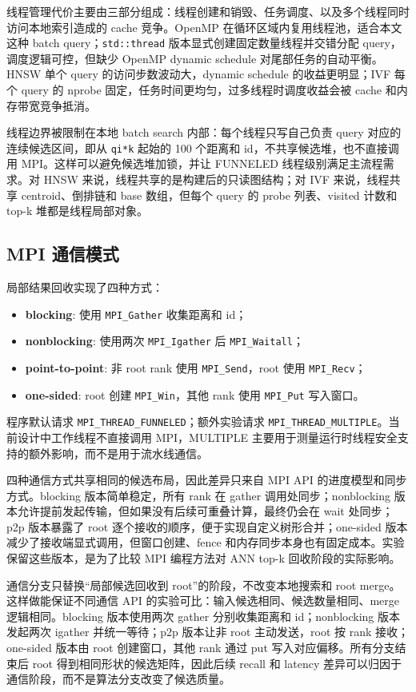 \documentclass[11pt,a4paper]{article}
\begin{document}
线程管理代价主要由三部分组成：线程创建和销毁、任务调度、以及多个线程同时访问本地索引造成的 cache 竞争。OpenMP 在循环区域内复用线程池，适合本文这种 batch query；\texttt{std::thread} 版本显式创建固定数量线程并交错分配 query，调度逻辑可控，但缺少 OpenMP dynamic schedule 对尾部任务的自动平衡。HNSW 单个 query 的访问步数波动大，dynamic schedule 的收益更明显；IVF 每个 query 的 nprobe 固定，任务时间更均匀，过多线程时调度收益会被 cache 和内存带宽竞争抵消。

线程边界被限制在本地 batch search 内部：每个线程只写自己负责 query 对应的连续候选区间，即从 \texttt{qi*k} 起始的 100 个距离和 id，不共享候选堆，也不直接调用 MPI。这样可以避免候选堆加锁，并让 FUNNELED 线程级别满足主流程需求。对 HNSW 来说，线程共享的是构建后的只读图结构；对 IVF 来说，线程共享 centroid、倒排链和 base 数组，但每个 query 的 probe 列表、visited 计数和 top-k 堆都是线程局部对象。

\subsection{MPI 通信模式}

局部结果回收实现了四种方式：
\begin{itemize}
    \item \textbf{blocking}: 使用 \texttt{MPI\_Gather} 收集距离和 id；
    \item \textbf{nonblocking}: 使用两次 \texttt{MPI\_Igather} 后 \texttt{MPI\_Waitall}；
    \item \textbf{point-to-point}: 非 root rank 使用 \texttt{MPI\_Send}，root 使用 \texttt{MPI\_Recv}；
    \item \textbf{one-sided}: root 创建 \texttt{MPI\_Win}，其他 rank 使用 \texttt{MPI\_Put} 写入窗口。
\end{itemize}
程序默认请求 \texttt{MPI\_THREAD\_FUNNELED}；额外实验请求 \texttt{MPI\_THREAD\_MULTIPLE}。当前设计中工作线程不直接调用 MPI，MULTIPLE 主要用于测量运行时线程安全支持的额外影响，而不是用于流水线通信。

四种通信方式共享相同的候选布局，因此差异只来自 MPI API 的进度模型和同步方式。blocking 版本简单稳定，所有 rank 在 gather 调用处同步；nonblocking 版本允许提前发起传输，但如果没有后续可重叠计算，最终仍会在 wait 处同步；p2p 版本暴露了 root 逐个接收的顺序，便于实现自定义树形合并；one-sided 版本减少了接收端显式调用，但窗口创建、fence 和内存同步本身也有固定成本。实验保留这些版本，是为了比较 MPI 编程方法对 ANN top-k 回收阶段的实际影响。

通信分支只替换“局部候选回收到 root”的阶段，不改变本地搜索和 root merge。这样做能保证不同通信 API 的实验可比：输入候选相同、候选数量相同、merge 逻辑相同。blocking 版本使用两次 gather 分别收集距离和 id；nonblocking 版本发起两次 igather 并统一等待；p2p 版本让非 root 主动发送，root 按 rank 接收；one-sided 版本由 root 创建窗口，其他 rank 通过 put 写入对应偏移。所有分支结束后 root 得到相同形状的候选矩阵，因此后续 recall 和 latency 差异可以归因于通信阶段，而不是算法分支改变了候选质量。
\end{document}
